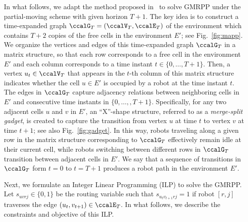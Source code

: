 \documentclass[Afour,sageh,times]{sagej}
\begin{document}
{{  In what follows, we adapt the method proposed in~\cite{yu2016optimal} to solve GMRPP under the partial-moving scheme with given horizon $T+1$.   The key idea is to construct a time-expanded graph $\ccalG_T = (\ccalV_T, \ccalE_T)$ of the environment which contains $T+2$ copies of the free cells in the environment $E'$; see Fig.~\ref{fig:mapp}. We organize the vertices and edges of this time-expanded graph $\ccalG_T$ in a matrix structure, so that each row corresponds to a free cell in the environment $E'$ and each column corresponds to a time instant $t\in \{0,\ldots,T+1\}$. Then, a vertex $u_t \in \ccalV_T$ that appears in the $t$-th column of this matrix structure indicates whether the cell $u\in E'$ is occupied by a robot at the time instant $t$. The edges in $\ccalG_T$ capture  adjacency relations between neighboring cells in $E'$ and consecutive time instants in $\{0,\ldots,,T+1\}$. Specifically, for any two adjacent cells $u$ and $v$ in $E'$, an ``X''-shape structure, referred to as a {\it merge-split gadget}, is created to capture the transition from vertex $u$ at time $t$ to vertex $v$ at time $t+1$; see also Fig.~\ref{fig:gadget}. In this way, robots traveling along a given row in the matrix structure corresponding to $\ccalG_T$ effectively remain idle at their current cell, while robots switching between different rows in $\ccalG_T$ transition between adjacent cells in $E'$. We say that a sequence of transitions in $\ccalG_T$ form $t=0$ to $t=T+1$ produces a robot path in the environment $E'$.

Next, we formulate an Integer Linear Programming (ILP) to solve the GMRPP. Let $s_{uvrj} \in\{0,1\}$ be the routing variable such that $s_{u_{t}v_{t+1}rj} = 1$ if robot $[r,j]$ traverses the edge $(u_t,v_{t+1}) \in \ccalE_T$. In what follows, we describe the constraints and objective of this ILP.


}}
\end{document}
